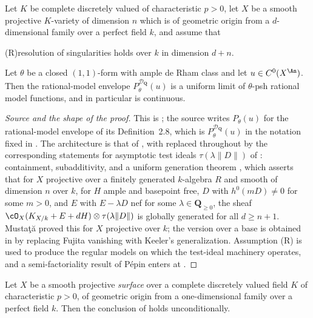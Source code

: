 \begin{theorem}
\label{thm:ch23-gjkm-positive-characteristic}
Let $K$ be complete discretely valued of characteristic $p>0$, let $X$
be a smooth projective $K$-variety of dimension $n$ which is of
geometric origin from a $d$-dimensional family over a perfect field
$k$, and assume that
\begin{center}
\textup{(R)}\quad resolution of singularities holds over $k$
in dimension $d+n$.
\end{center}
Let $\theta$ be a closed $(1,1)$-form with ample de Rham class and let
$u\in C^0(X^{\An})$.  Then the rational-model envelope
$P^{\mathcal D_{\mathbf Q}}_\theta(u)$ is a uniform limit of
$\theta$-psh rational model functions, and in particular is continuous.
\end{theorem}

\begin{proof}[Source and the shape of the proof]
This is \cite[Theorem~8.2]{GJKM19}; the source writes
$P_\theta(u)$ for the rational-model envelope of its Definition~2.8, which
is $P^{\mathcal D_{\mathbf Q}}_\theta(u)$ in the notation fixed in
.  The architecture is that of
, with
 replaced throughout by the
corresponding statements for asymptotic test ideals
$\tau(\lambda\|D\|)$ of : containment,
subadditivity, and a uniform generation theorem
\cite[Theorem~1.3 and Theorem~4.6]{GJKM19}, which asserts that for
$X$ projective over a finitely generated $k$-algebra $R$ and smooth of
dimension $n$ over $k$, for $H$ ample and basepoint free, $D$ with
$h^0(mD)\neq0$ for some $m>0$, and $E$ with $E-\lambda D$ nef for
some $\lambda\in\mathbf Q_{\geq0}$, the sheaf
$\cO_X(K_{X/k}+E+dH)\otimes\tau(\lambda\|D\|)$ is globally generated for
all $d\geq n+1$.  Musta\c{t}\u{a} proved this for $X$ projective over $k$;
the version over a base is obtained in \cite[Theorem~4.6]{GJKM19} by
replacing Fujita vanishing with Keeler's generalization.  Assumption
\textup{(R)} is used to produce the regular models on which the test-ideal
machinery operates, and a semi-factoriality result of P\'epin enters at
\cite[Lemma~7.5]{GJKM19}.
\end{proof}

\begin{corollary}
\label{cor:ch23-gjkm-surfaces}
Let $X$ be a smooth projective \emph{surface} over a complete discretely
valued field $K$ of characteristic $p>0$, of geometric origin from a
one-dimensional family over a perfect field $k$.  Then the conclusion of
 holds unconditionally.
\end{corollary}

